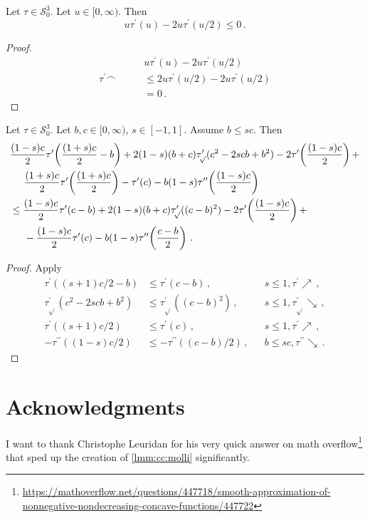 \documentclass{article}
\newcommand{\lb}{\left(} %
\newcommand{\rb}{\right)} %
\newcommand{\br}[1]{\lb #1 \rb} %
\newcommand{\brOf}[1]{\!\br{#1}} %
\newcommand*{\mc}[1]{\mathcal{#1}}
\newcommand{\Rp}{[0, \infty)} %
\newcommand{\pr}{^\prime}
\newcommand{\prr}{^{\prime\prime}}
\newcommand{\equationFullstop}{\, .}
\newcommand{\eqfs}{\equationFullstop}
\newcommand{\equationComma}{\, ,}
\newcommand{\eqcm}{\equationComma}
\newcommand{\tran}{\tau}
\newcommand{\trans}{\tran_{\!\sqrt{}}}
\newcommand{\dtrans}{\trans\pr}
\newcommand{\dtran}{\tran\pr}
\newcommand{\ddtran}{\tran\prr}
\newcommand{\setccod}[1]{\mc S_0^{#1}}
\begin{document}
\begin{appendix}
\begin{lemma}
	Let $\tran\in\setccod3$.
	Let $u\in\Rp$.
	Then
	\begin{equation*}
		u\dtran(u)
		- 2u\dtran(u/2)
		\leq
		0
		\eqfs
	\end{equation*}
\end{lemma}
%
\begin{proof}
	\begin{align*}
		&
		u\dtran(u)
		- 2u\dtran(u/2)
		\\
		\dtran \smallfrown
		\qquad&\leq
		2u\dtran(u/2)
		- 2u\dtran(u/2)
		\\
		\qquad&=		
		0
		\eqfs
	\end{align*}
\end{proof}
%
%
%
\begin{lemma}\label{mech:17}
	Let $\tran\in\setccod3$.
	Let $b,c\in\Rp$, $s\in[-1,1]$.
	Assume $b\leq sc$.
	Then
	\begin{align*}
		&
		\frac{(1-s)c}2\dtran\brOf{\frac{(1+s)c}2 - b} 
		+ 2(1-s)(b+c)\dtrans( c^2 - 2scb + b^2)
		- 2\dtran\brOf{\frac{(1-s)c}2} 
		+ 
		\\&\hphantom{=}\ \ 
		\frac{(1+s)c}2 \dtran\brOf{\frac{(1+s)c}2} 
		- \dtran(c)
		- b(1-s)\ddtran\brOf{\frac{(1-s)c}2} 
		\\&\leq
		\frac{(1-s)c}2\dtran( c-b)
		+ 2(1-s)(b+c)\dtrans( (c-b)^2)
		- 2\dtran\brOf{\frac{(1-s)c}2} 
		+ 
		\\&\hphantom{=}\ \ 
		-\frac{(1-s)c}2\dtran( c)
		- b(1-s)\ddtran\brOf{\frac{c-b}2}
		\eqfs
	\end{align*}
\end{lemma}
%
\begin{proof}
	Apply
	\begin{align*}
		\dtran( (s+1)c/2-b) &\leq \dtran( c-b)\eqcm && s\leq 1,\dtran\nearrow\eqcm\\
		\dtrans( c^2 - 2scb + b^2) &\leq \dtrans( (c-b)^2)\eqcm&& s\leq 1,\dtrans\searrow\eqcm\\
		\dtran( (s+1)c/2) &\leq \dtran(c)\eqcm&& s\leq 1,\dtran\nearrow\eqcm\\
		-\ddtran((1-s)c/2) &\leq -\ddtran((c-b)/2)\eqcm&& b\leq sc,\ddtran\searrow
		\eqfs
	\end{align*}
\end{proof}
%
%
%
%
\end{appendix}
%
%
\section*{Acknowledgments}
%
I want to thank Christophe Leuridan for his very quick answer on math overflow\footnote{\url{https://mathoverflow.net/questions/447718/smooth-approximation-of-nonnegative-nondecreasing-concave-functions/447722}} that sped up the creation of \cref{lmm:cc:molli} significantly.%
%
%
%
%
\printbibliography
%
%
%
\end{document}

